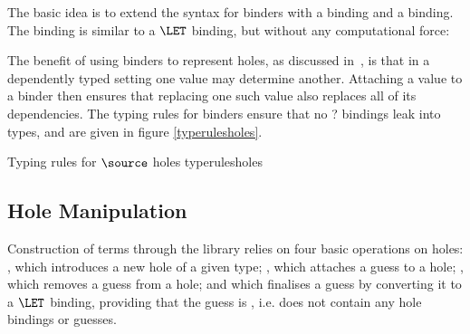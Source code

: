 The basic idea is to extend the syntax for binders with a 
binding and a  binding. The  binding is
similar to a $\LET$ binding, but without any computational force:


The benefit of using binders to represent holes, as discussed
in~\cite{mcbride-thesis}, is that in a dependently typed setting one
value may determine another. Attaching a value to a binder then
ensures that replacing one such value also replaces all of its
dependencies. The typing rules for binders ensure that no ? bindings
leak into types, and are given in figure \ref{typerulesholes}.

{Typing rules for $\source$ holes}
{typerulesholes}

\subsection{Hole Manipulation}

\label{holeops}

Construction of terms through the \Ivor{} library relies on four basic
operations on holes: , which introduces a new hole of a
given type; , which attaches a guess to a hole;
, which removes a guess from a hole; and 
which finalises a guess by converting it to a $\LET$ binding,
providing that the guess is , i.e. does not contain any
hole bindings or guesses.


